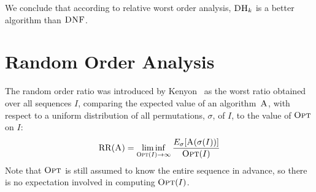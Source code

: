 \documentclass[11pt]{article}
\newcommand{\ALG}{\ensuremath{\operatorname{\textsc{A}}}\xspace}
\newcommand{\OPT}{\ensuremath{\operatorname{\textsc{Opt}}}\xspace}
\newcommand{\DNF}{\ensuremath{\operatorname{\textsc{DNF}}}\xspace}
\newcommand{\DHk}{{\ensuremath{\textsc{DH}_k}}\xspace}
\newcommand{\RO}[1]{\ensuremath{\mathrm{RR}(#1)}\xspace}
\begin{document}
We conclude that according to relative worst
order analysis, \DHk is a better algorithm than \DNF.

\section{Random Order Analysis}
The random order ratio was introduced by Kenyon~\cite{K96} as the worst ratio obtained over all sequences $I$, comparing the expected value of an algorithm~\ALG, with respect to a uniform distribution of all permutations, $\sigma$, of $I$, to the value of \OPT on $I$:
\[
 \RO{\ALG} = \liminf\limits_{\OPT(I)\rightarrow \infty} \frac{E_{\sigma}[\ALG(\sigma(I))]}{\OPT(I)}
\]
Note that \OPT is still assumed to know the entire sequence in advance,
so there is no expectation involved in computing $\OPT(I)$.
\end{document}
